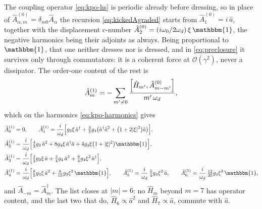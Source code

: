 \documentclass[a4paper,11pt]{article}
\newcommand{\id}{\mathbbm{1}}
\begin{document}
\begin{example}
The coupling operator \eqref{eq:kpo-hs} is periodic already before dressing, so in place of $\hat A^{(0)}_{\alpha,m} = \delta_{m0}\hat A_\alpha$ the recursion \eqref{eq:kickedAgraded} starts from $\hat A^{(0)}_{1} = i\,\hat a$, together with the displacement c-number $\hat A^{(0)}_{2} = (i\omega_0/2\omega_d)\,\xi\,\id$, the negative harmonics being their adjoints as always. Being proportional to $\id$, that one neither dresses nor is dressed, and in \eqref{eq:preclosure} it survives only through commutators: it is a coherent force at $\mathcal O(\gamma^2)$, never a dissipator. The order-one content of the rest is
\begin{equation}\label{eq:kpo-sideband-rec}
  \hat A^{(1)}_m = -\sum_{m'\neq0}\frac{\comm{\hat H_{m'}}{\hat A^{(0)}_{m-m'}}}{m'\,\omega_d},
\end{equation}
which on the harmonics \eqref{eq:kpo-harmonics} gives
\begin{equation}\label{eq:kpo-sidebands}
  \begin{aligned}
    \hat A^{(1)}_0 &= 0,
    \qquad
    \hat A^{(1)}_1 = \frac{i}{\omega_d}\Big[g_3\xi\,\hat a^\dagger
      + \tfrac32 g_4\big(\hat a^\dagger\hat a^2 + \big(1+2\lvert\xi\rvert^2\big)\hat a\big)\Big],\\
    \hat A^{(1)}_2 &= \frac{i}{\omega_d}\Big[\tfrac43 g_3\,\hat a^2 + 8g_4\xi\,\hat a^\dagger\hat a
      + 4g_4\xi\big(1+\lvert\xi\rvert^2\big)\id\Big],\\
    \hat A^{(1)}_3 &= \frac{i}{\omega_d}\Big[\tfrac32 g_3\xi\,\hat a + \tfrac34 g_4\,\hat a^3
      + \tfrac94 g_4\xi^2\,\hat a^\dagger\Big],\\
    \hat A^{(1)}_4 &= \frac{i}{\omega_d}\Big[\tfrac85 g_4\xi\,\hat a^2
      + \tfrac{8}{15}g_3\xi^2\,\id\Big],
    \qquad
    \hat A^{(1)}_5 = \frac{i}{\omega_d}\,\tfrac54 g_4\xi^2\,\hat a ,
    \qquad
    \hat A^{(1)}_6 = \frac{i}{\omega_d}\,\tfrac{12}{35}g_4\xi^3\,\id ,
  \end{aligned}
\end{equation}
and $\hat A_{-m} = \hat A_m^\dagger$. The list closes at $|m| = 6$: no $\hat H_m$ beyond $m=7$ has operator content, and the last two that do, $\hat H_6\propto\hat a^2$ and $\hat H_7\propto\hat a$, commute with $\hat a$.


\end{example}
\end{document}
